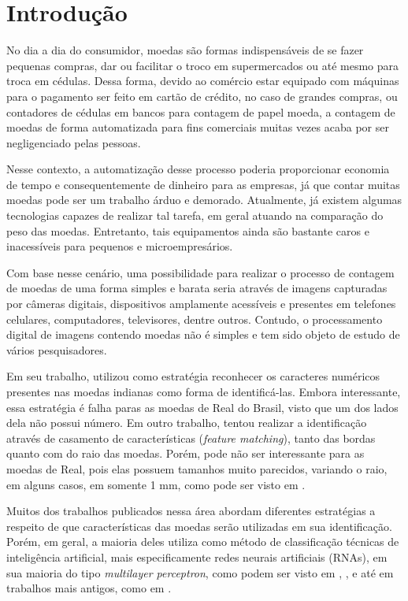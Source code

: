 \documentclass[10pt,journal]{IEEEtran}
\begin{document}
\section{Introdução}
\label{sec:introducao}

No dia a dia do consumidor, moedas são formas indispensáveis de se fazer pequenas compras, dar ou facilitar o troco em supermercados ou até mesmo para troca em cédulas. Dessa forma, devido ao comércio estar equipado com máquinas para o pagamento ser feito em cartão de crédito, no caso de grandes compras, ou contadores de cédulas em bancos para contagem de papel moeda, a contagem de moedas de forma automatizada para fins comerciais  muitas vezes acaba por ser negligenciado pelas pessoas.

Nesse contexto, a automatização desse processo poderia proporcionar economia de tempo e consequentemente de dinheiro para as empresas, já que contar muitas moedas pode ser um trabalho árduo e demorado. Atualmente, já existem algumas tecnologias capazes de realizar tal tarefa, em geral atuando na comparação do peso das moedas. Entretanto, tais equipamentos ainda são bastante caros e inacessíveis para pequenos e microempresários.

Com base nesse cenário, uma possibilidade para realizar o processo de contagem de moedas de uma forma simples e barata seria através de imagens capturadas por câmeras digitais, dispositivos amplamente acessíveis e presentes em telefones celulares, computadores, televisores, dentre outros. Contudo, o processamento digital de imagens contendo moedas não é simples e tem sido objeto de estudo de vários pesquisadores.

Em seu trabalho, \cite{bremananth2005new} utilizou como estratégia reconhecer os caracteres numéricos presentes nas moedas indianas como forma de identificá-las. Embora interessante, essa estratégia é falha paras as moedas de Real do Brasil, visto que um dos lados dela não possui número. Em outro trabalho, \cite{chetan2013robust} tentou realizar a identificação através de casamento de características (\textit{feature matching}), tanto das bordas quanto com do raio das moedas. Porém, pode não ser interessante para as moedas de Real, pois elas possuem tamanhos muito parecidos, variando o raio, em alguns casos, em somente 1 mm, como pode ser visto em \cite{bcb}.

Muitos dos trabalhos publicados nessa área abordam diferentes estratégias a respeito de que características das moedas serão utilizadas em sua identificação. Porém, em geral, a maioria deles utiliza como método de classificação técnicas de inteligência artificial, mais especificamente redes neurais artificiais (RNAs), em sua maioria do tipo \textit{multilayer perceptron}, como podem ser visto em \cite{bremananth2005new}, \cite{kaur2015coin}, \cite{modi2013automated} e até em trabalhos mais antigos, como em \cite{fukumi1992rotation}.
\end{document}
